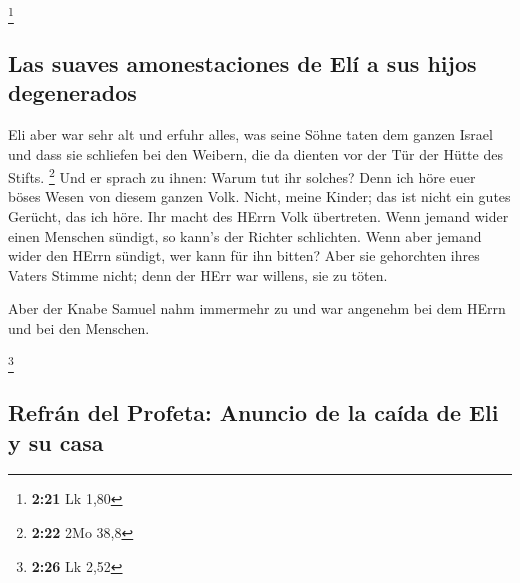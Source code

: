 \footnote{\textbf{2:21} Lk 1,80}

\hypertarget{las-suaves-amonestaciones-de-eluxed-a-sus-hijos-degenerados}{%
\subsection{Las suaves amonestaciones de Elí a sus hijos
degenerados}\label{las-suaves-amonestaciones-de-eluxed-a-sus-hijos-degenerados}}

 Eli aber war sehr alt und erfuhr alles, was seine Söhne
taten dem ganzen Israel und dass sie schliefen bei den Weibern, die da
dienten vor der Tür der Hütte des Stifts. \footnote{\textbf{2:22} 2Mo
  38,8}  Und er sprach zu ihnen: Warum tut ihr solches?
Denn ich höre euer böses Wesen von diesem ganzen Volk. 
Nicht, meine Kinder; das ist nicht ein gutes Gerücht, das ich höre. Ihr
macht des HErrn Volk übertreten.  Wenn jemand wider einen
Menschen sündigt, so kann's der Richter schlichten. Wenn aber jemand
wider den HErrn sündigt, wer kann für ihn bitten? Aber sie gehorchten
ihres Vaters Stimme nicht; denn der HErr war willens, sie zu töten.

 Aber der Knabe Samuel nahm immermehr zu und war angenehm
bei dem HErrn und bei den Menschen.

\footnote{\textbf{2:26} Lk 2,52}

\hypertarget{refruxe1n-del-profeta-anuncio-de-la-cauxedda-de-eli-y-su-casa}{%
\subsection{Refrán del Profeta: Anuncio de la caída de Eli y su
casa}\label{refruxe1n-del-profeta-anuncio-de-la-cauxedda-de-eli-y-su-casa}}


